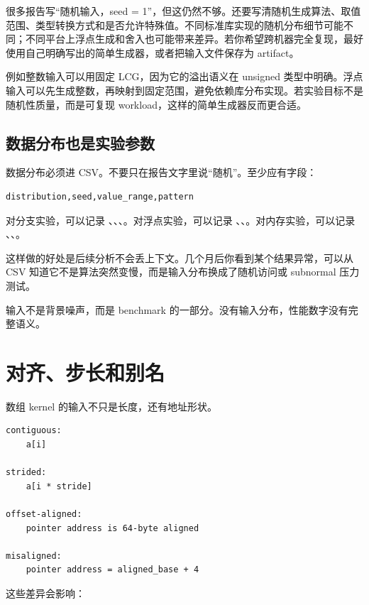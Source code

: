 很多报告写“随机输入，seed = 1”，但这仍然不够。还要写清随机生成算法、取值范围、类型转换方式和是否允许特殊值。不同标准库实现的随机分布细节可能不同；不同平台上浮点生成和舍入也可能带来差异。若你希望跨机器完全复现，最好使用自己明确写出的简单生成器，或者把输入文件保存为 artifact。

例如整数输入可以用固定 LCG，因为它的溢出语义在 unsigned 类型中明确。浮点输入可以先生成整数，再映射到固定范围，避免依赖库分布实现。若实验目标不是随机性质量，而是可复现 workload，这样的简单生成器反而更合适。

\subsection{数据分布也是实验参数}

数据分布必须进 CSV。不要只在报告文字里说“随机”。至少应有字段：

\begin{lstlisting}
distribution,seed,value_range,pattern
\end{lstlisting}

对分支实验，可以记录 、、、。对浮点实验，可以记录 、、。对内存实验，可以记录 、、。

这样做的好处是后续分析不会丢上下文。几个月后你看到某个结果异常，可以从 CSV 知道它不是算法突然变慢，而是输入分布换成了随机访问或 subnormal 压力测试。

\begin{warningbox}
输入不是背景噪声，而是 benchmark 的一部分。没有输入分布，性能数字没有完整语义。
\end{warningbox}

\section{对齐、步长和别名}

数组 kernel 的输入不只是长度，还有地址形状。

\begin{lstlisting}
contiguous:
    a[i]

strided:
    a[i * stride]

offset-aligned:
    pointer address is 64-byte aligned

misaligned:
    pointer address = aligned_base + 4
\end{lstlisting}

这些差异会影响：

